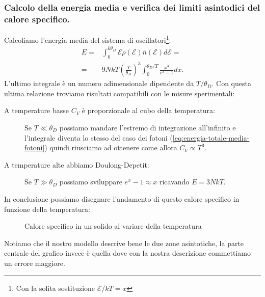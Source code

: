 \subsubsection{Calcolo della energia media e verifica dei limiti asintodici del calore specifico.}
\label{subsubsec:Calcolo della energia media e verifica dei limiti asintodici del calore specifico.}
Calcoliamo l'energia media del sistema di oscillatori\footnote{Con la solita sostituzione $\mathcal{E} /kT = x$}:
\[\begin{aligned}
	E 
	=&
	\int_{0}^{k\theta _D} 
	\mathcal{E} \rho (\mathcal{E} ) 
	\overline{n}( \mathcal{E} ) 
	d\mathcal{E} = \\
	=& 
	9NkT 
	\left( \frac{T}{\theta _D} \right)^3
	\int_{0}^{\theta _D /T} 
	\frac{x^3}{e^x-1}
	dx
.\end{aligned}\]
L'ultimo integrale è un numero adimensionale dipendente da $T /\theta _D$. Con questa ultima relazione troviamo risultati compatibili con le misure sperimentali:
\begin{description}
	\item[A temperature basse $C_V$ è proporzionale al cubo della temperatura:]
		Se $T \ll \theta _D$ possiamo mandare l'estremo di integrazione
		all'infinito e l'integrale diventa lo stesso del caso dei fotoni 
		(\ref{eq:energia-totale-media-fotoni}) quindi riusciamo ad ottenere
		come allora $C_V \propto T^3$. 
	\item[A temperature alte abbiamo Doulong-Depetit:] 
		Se $T \gg \theta _D$ possiamo sviluppare $e^x-1 \approx x$ 
		ricavando $E = 3NkT$.
\end{description}
In conclusione possiamo disegnare l'andamento di questo calore specifico in funzione della temperatura:
\begin{figure}[H]
    \centering
    \caption{Calore specifico in un solido al variare della temperatura}
    \label{fig:calore-specifico-in-un-solido-al-variare-della-temperatura}
\end{figure}
\noindent
Notiamo che il nostro modello descrive bene le due zone asintotiche, la parte centrale del grafico invece è quella dove con la nostra descrizione commettiamo un errore maggiore.
